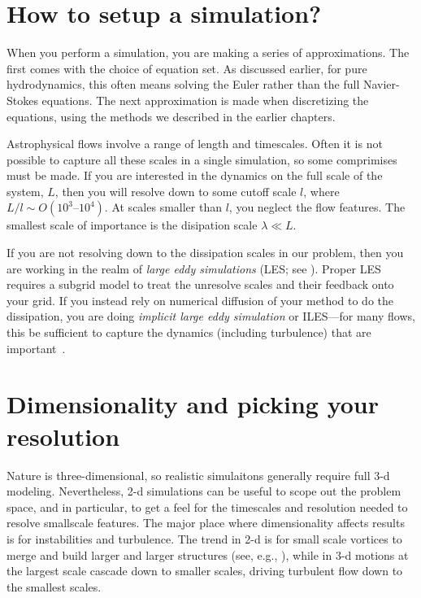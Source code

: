 \section{How to setup a simulation?}

When you perform a simulation, you are making a series of
approximations.  The first comes with the choice of equation set.  As
discussed earlier, for pure hydrodynamics, this often means solving
the Euler rather than the full Navier-Stokes equations.  The next
approximation is made when discretizing the equations, using the 
methods we described in the earlier chapters.  

Astrophysical flows involve a range of length and timescales.  Often
it is not possible to capture all these scales in a single simulation,
so some comprimises must be made.  If you are interested in the
dynamics on the full scale of the system, $L$, then you will resolve
down to some cutoff scale $l$, where $L/l \sim O(10^3\mbox{--}10^4)$.
At scales smaller than $l$, you neglect the flow features.  The
smallest scale of importance is the disipation scale $\lambda \ll L$.

If you are not resolving down to the dissipation scales in our
problem, then you are working in the realm of {\em large eddy
  simulations} (LES; see \cite{schmidt:2014}).  Proper LES requires a
subgrid model to treat the unresolve scales and their feedback onto
your grid.  If you instead rely on numerical diffusion of your method
to do the dissipation, you are doing {\em implicit large eddy
  simulation} or ILES---for many flows, this be sufficient to capture the
dynamics (including turbulence) that are important~\cite{aspden:2008,MargolinRider:2002}.

\section{Dimensionality and picking your resolution}

Nature is three-dimensional, so realistic simulaitons generally
require full 3-d modeling.  Nevertheless, 2-d simulations can be
useful to scope out the problem space, and in particular, to get a
feel for the timescales and resolution needed to resolve smallscale
features.  The major place where dimensionality affects results is for
instabilities and turbulence.  The trend in 2-d is for small scale
vortices to merge and build larger and larger structures (see, e.g.,
\cite{twodturbulence}), while in 3-d motions at the largest scale
cascade down to smaller scales, driving turbulent flow down to the
smallest scales.

